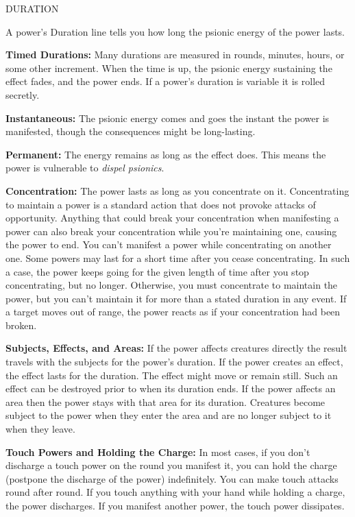 \documentclass{article}
\begin{document}
\vspace{12pt}
DURATION

A power's Duration line tells you how long the psionic energy of the power lasts.

\textbf{Timed Durations:} Many durations are measured in rounds, minutes, hours, 
or some other increment. When the time is up, the psionic energy sustaining the 
effect fades, and the power ends. If a power's duration is variable it is rolled 
secretly.

\textbf{Instantaneous: }The psionic energy comes and goes the instant the power 
is manifested, though the consequences might be long-lasting.

\textbf{Permanent: }The energy remains as long as the effect does. This means the 
power is vulnerable to \textit{dispel psionics}.

\textbf{Concentration:} The power lasts as long as you concentrate on it. Concentrating 
to maintain a power is a standard action that does not provoke attacks of opportunity. 
Anything that could break your concentration when manifesting a power can also 
break your concentration while you're maintaining one, causing the power to end. 
You can't manifest a power while concentrating on another one. Some powers may 
last for a short time after you cease concentrating. In such a case, the power 
keeps going for the given length of time after you stop concentrating, but no longer. 
Otherwise, you must concentrate to maintain the power, but you can't maintain it 
for more than a stated duration in any event. If a target moves out of range, the 
power reacts as if your concentration had been broken.

\textbf{Subjects, Effects, and Areas:} If the power affects creatures directly 
the result travels with the subjects for the power's duration. If the power creates 
an effect, the effect lasts for the duration. The effect might move or remain still. 
Such an effect can be destroyed prior to when its duration ends. If the power affects 
an area then the power stays with that area for its duration. Creatures become 
subject to the power when they enter the area and are no longer subject to it when 
they leave.

\textbf{Touch Powers and Holding the Charge:} In most cases, if you don't discharge 
a touch power on the round you manifest it, you can hold the charge (postpone the 
discharge of the power) indefinitely. You can make touch attacks round after round. 
If you touch anything with your hand while holding a charge, the power discharges. 
If you manifest another power, the touch power dissipates.
\end{document}
